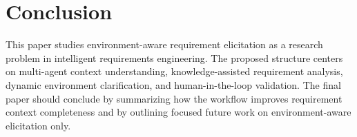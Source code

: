 \section{Conclusion}
\label{conclusion}

This paper studies environment-aware requirement elicitation as a research problem in intelligent requirements engineering.
The proposed structure centers on multi-agent context understanding, knowledge-assisted requirement analysis, dynamic environment clarification, and human-in-the-loop validation.
The final paper should conclude by summarizing how the workflow improves requirement context completeness and by outlining focused future work on environment-aware elicitation only.
